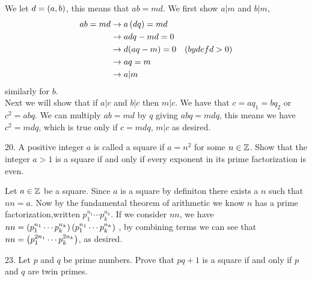 \begin{mdframed}[style=darkAnswer,frametitle={Joe Starr}]
We let $d=\left(a,b\right)$, this means that $ab=md$. We first show $a|m$ and $b|m$, 
\begin{align*}
    ab=md   &\rightarrow a\left(dq\right)=md \\
            &\rightarrow adq-md=0 \\
            &\rightarrow d(aq-m)=0 & (by def d>0)\\
            &\rightarrow aq=m \\
            &\rightarrow a|m \\
\end{align*}
similarly for  $b$. \\
Next we will show that if $a|c$ and $b|c$ then $m|c$. We have that $c=aq_1=bq_2$
or $c^2=abq$. We can multiply $ab=md$ by $q$ giving $abq=mdq$, this means we 
have $c^2=mdq$, which is true only if $c=mdq$, $m|c$ as desired. 
\end{mdframed}
\newpage
\begin{mdframed}[style=darkQuesion]
20. A positive integer $a$ is called a square if $a=n^2$ for some $n\in \mathbb{Z}$. 
Show that the integer $a>1$ is a square if and only if every exponent in its 
prime factorization is even. 
\end{mdframed}

\begin{mdframed}[style=darkAnswer,frametitle={Joe Starr}]
Let $a\in \mathbb{Z}$ be a square. Since $a$ is a square by definiton there exists 
a $n$ such that $nn=a$. Now by the fundamental theorem of arithmetic we know $n$
has a prime factorization,written $p_1^{n_1}\cdots p_k^{n_k}$. If we consider 
$nn$, we have $nn = \left(p_1^{n_1}\cdots p_k^{n_k}\right)
                    \left(p_1^{n_1}\cdots p_k^{n_k}\right)$
, by combining terms we can see that $nn= \left(p_1^{2n_1}\cdots p_k^{2n_k}\right)$, as
desired. 
\end{mdframed}
\newpage
\begin{mdframed}[style=darkQuesion]
23. Let $p$ and $q$ be prime numbers. Prove that $pq+1$ is a square if and only 
if $p$ and $q$ are twin primes.
\end{mdframed}

